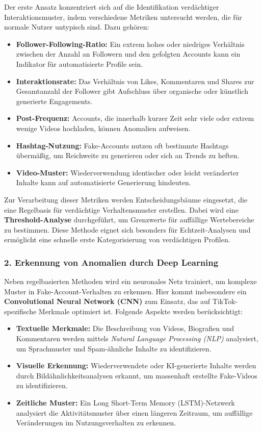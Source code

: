 \documentclass[12pt]{report}
\begin{document}
Der erste Ansatz konzentriert sich auf die Identifikation verdächtiger Interaktionsmuster, indem verschiedene Metriken untersucht werden, die für normale Nutzer untypisch sind. Dazu gehören:
\begin{itemize}
	\item \textbf{Follower-Following-Ratio:} Ein extrem hohes oder niedriges Verhältnis zwischen der Anzahl an Followern und den gefolgten Accounts kann ein Indikator für automatisierte Profile sein.
	\item \textbf{Interaktionsrate:} Das Verhältnis von Likes, Kommentaren und Shares zur Gesamtanzahl der Follower gibt Aufschluss über organische oder künstlich generierte Engagements.
	\item \textbf{Post-Frequenz:} Accounts, die innerhalb kurzer Zeit sehr viele oder extrem wenige Videos hochladen, können Anomalien aufweisen.
	\item \textbf{Hashtag-Nutzung:} Fake-Accounts nutzen oft bestimmte Hashtags übermäßig, um Reichweite zu generieren oder sich an Trends zu heften.
	\item \textbf{Video-Muster:} Wiederverwendung identischer oder leicht veränderter Inhalte kann auf automatisierte Generierung hindeuten.
\end{itemize}

Zur Verarbeitung dieser Metriken werden Entscheidungsbäume eingesetzt, die eine Regelbasis für verdächtige Verhaltensmuster erstellen. Dabei wird eine \textbf{Threshold-Analyse} durchgeführt, um Grenzwerte für auffällige Wertebereiche zu bestimmen. Diese Methode eignet sich besonders für Echtzeit-Analysen und ermöglicht eine schnelle erste Kategorisierung von verdächtigen Profilen.

\subsubsection{2. Erkennung von Anomalien durch Deep Learning}

Neben regelbasierten Methoden wird ein neuronales Netz trainiert, um komplexe Muster in Fake-Account-Verhalten zu erkennen. Hier kommt insbesondere ein \textbf{Convolutional Neural Network (CNN)} zum Einsatz, das auf TikTok-spezifische Merkmale optimiert ist. Folgende Aspekte werden berücksichtigt:
\begin{itemize}
	\item \textbf{Textuelle Merkmale:} Die Beschreibung von Videos, Biografien und Kommentaren werden mittels \textit{Natural Language Processing (NLP)} analysiert, um Sprachmuster und Spam-ähnliche Inhalte zu identifizieren.
	\item \textbf{Visuelle Erkennung:} Wiederverwendete oder KI-generierte Inhalte werden durch Bildähnlichkeitsanalysen erkannt, um massenhaft erstellte Fake-Videos zu identifizieren.
	\item \textbf{Zeitliche Muster:} Ein Long Short-Term Memory (LSTM)-Netzwerk analysiert die Aktivitätsmuster über einen längeren Zeitraum, um auffällige Veränderungen im Nutzungsverhalten zu erkennen.
\end{itemize}
\end{document}
